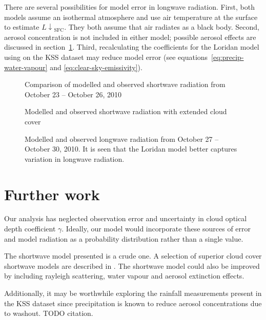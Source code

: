 \documentclass[a4paper,titlepage, twoside]{report}
\newcommand\Ldownsfc{{L\!\!\downarrow}_\mathrm{SFC}}
\begin{document}
There are several possibilities for model error in longwave radiation.  First, both models assume an isothermal atmosphere and use air temperature at the surface to estimate $\Ldownsfc$.  They both assume that air radiates as a black body.  Second, aerosol concentration is not included in either model; possible aerosol effects are discussed in section~\ref{sec:further-work}.  Third, recalculating the coefficients for the Loridan model using on the KSS dataset may reduce model error (see equations~\ref{eq:precip-water-vapour} and \ref{eq:clear-sky-emissivity}).
\begin {figure}
\centering

\caption{Comparison of modelled and observed shortwave radiation from October 23 -- October 26, 2010}
\label{fig:shortwave-verification}
\end{figure}

\begin{figure}
\centering

\caption{Modelled and observed shortwave radiation with extended cloud cover}
\label{fig:extended-cloud}
\end{figure}

\begin{figure}
\centering

\caption{Modelled and observed longwave radiation from October 27 -- October 30, 2010.  It is seen that the Loridan model better captures variation in longwave radiation.}
\label{fig:longwave-verification}
\end{figure}

\section{Further work}
\label{sec:further-work}
Our analysis has neglected observation error and uncertainty in cloud optical depth coefficient $\gamma$.  Ideally, our model would incorporate these sources of error and model radiation as a probability distribution rather than a single value.

The shortwave model presented is a crude one.  A selection of superior cloud cover shortwave models are described in \cite{ingram}.  The shortwave model could also be improved by including rayleigh scattering, water vapour and aerosol extinction effects.

Additionally, it may be worthwhile exploring the rainfall measurements present in the KSS dataset since precipitation is known to reduce aerosol concentrations due to washout. TODO citation. 
\end{document}
